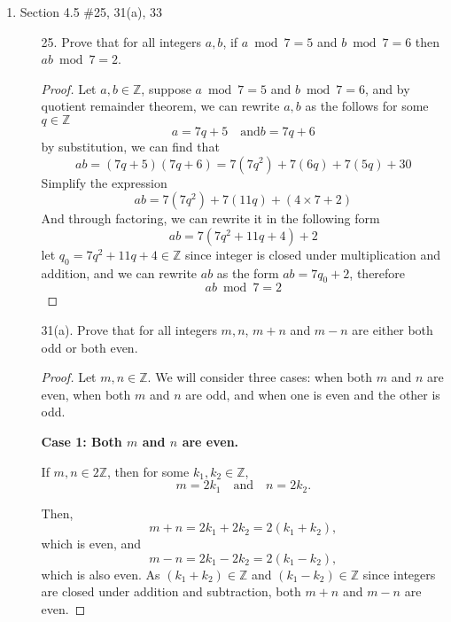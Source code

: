 \documentclass[12pt]{article}
\newcommand{\Z}{\mathbb{Z}}
\newcommand{\paren}[1]{\left( #1 \right)}
\begin{document}
\begin{enumerate}
        \newpage

    \item Section 4.5 \#25, 31(a), 33
        \begin{enumerate}
            \item[25.] Prove that for all integers $a,b$, if $a \bmod 7 = 5$ and $b \bmod 7 = 6$ then $ab \bmod 7 = 2$. 
                \begin{proof} Let $a,b \in \Z $, suppose $a \bmod 7 = 5$ and $b \bmod 7 = 6$, and by quotient remainder theorem, we can rewrite $a,b$ as the follows for some $q \in \Z$
                \[
                a = 7q+5 \quad \text{and} b = 7q + 6
                \]
                by substitution, we can find that
                \[
                ab = (7q+5)(7q+6) = 7\paren{7q^2}+7\paren{6q}+7\paren{5q}+30
                \]
                Simplify the expression
                \[
                ab = 7\paren{7q^2}+7\paren{11q}+ (4\times 7 + 2)
                \]
                And through factoring, we can rewrite it in the following form
                \[
                ab = 7 \paren{7q^2 + 11q + 4}+2
                \]
                let $q_0 = 7q^2 + 11q + 4 \in \Z$ since integer is closed under multiplication and addition, and we can rewrite $ab$ as the form $ab = 7q_0 + 2$, therefore
                \[
                ab \bmod 7 = 2
                \]
                    
                \end{proof}

            \item[31(a).] Prove that for all integers $m,n$, $m+n$ and $m-n$ are either both odd or both even. 
                \begin{proof}
                Let \(m, n \in \mathbb{Z}\). We will consider three cases: when both \(m\) and \(n\) are even, when both \(m\) and \(n\) are odd, and when one is even and the other is odd.
                
                \textbf{Case 1: Both \(m\) and \(n\) are even.}
                
                If \(m, n \in 2\mathbb{Z}\), then for some \(k_1, k_2 \in \mathbb{Z}\),
                \[ m = 2k_1 \quad \text{and} \quad n = 2k_2. \]
                
                Then,
                \[ m+n = 2k_1 + 2k_2 = 2(k_1+k_2), \]
                which is even, and
                \[ m-n = 2k_1 - 2k_2 = 2(k_1-k_2), \]
                which is also even. As \((k_1+k_2) \in \mathbb{Z}\) and \((k_1-k_2) \in \mathbb{Z}\) since integers are closed under addition and subtraction, both \(m+n\) and \(m-n\) are even.
                

\end{proof}
\end{enumerate}
\end{enumerate}
\end{document}
